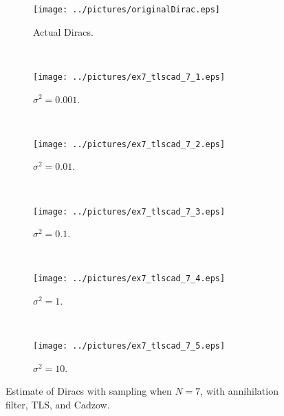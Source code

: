 \documentclass[11pt,a4paper]{report}
\begin{document}
\begin{figure}[H]
    \captionsetup[subfigure]{position=b}
    \centering
    \begin{subfigure}{0.49\textwidth}
        \texttt{[image: ../pictures/originalDirac.eps]}
        \caption{Actual Diracs.}
        \label{fig:ex7_tlscad_7_0}
    \end{subfigure}
    ~
    \begin{subfigure}{0.49\textwidth}
        \texttt{[image: ../pictures/ex7\_tlscad\_7\_1.eps]}
        \caption{$\sigma^2 = 0.001$.}
        \label{fig:ex7_tlscad_7_1}
    \end{subfigure}
    \\
    \begin{subfigure}{0.49\textwidth}
        \texttt{[image: ../pictures/ex7\_tlscad\_7\_2.eps]}
        \caption{$\sigma^2 = 0.01$.}
        \label{fig:ex7_tlscad_7_2}
    \end{subfigure}
    ~
    \begin{subfigure}{0.49\textwidth}
        \texttt{[image: ../pictures/ex7\_tlscad\_7\_3.eps]}
        \caption{$\sigma^2 = 0.1$.}
        \label{fig:ex7_tlscad_7_3}
    \end{subfigure}
    \\
    \begin{subfigure}{0.49\textwidth}
        \texttt{[image: ../pictures/ex7\_tlscad\_7\_4.eps]}
        \caption{$\sigma^2 = 1$.}
        \label{fig:ex7_tlscad_7_4}
    \end{subfigure}
    ~
    \begin{subfigure}{0.49\textwidth}
        \texttt{[image: ../pictures/ex7\_tlscad\_7\_5.eps]}
        \caption{$\sigma^2 = 10$.}
        \label{fig:ex7_tlscad_7_5}
    \end{subfigure}

    \caption{Estimate of Diracs with sampling when $N = 7$, with annihilation filter, TLS, and Cadzow.}
    \label{fig:ex7_tlscad_7}
\end{figure}
\end{document}
